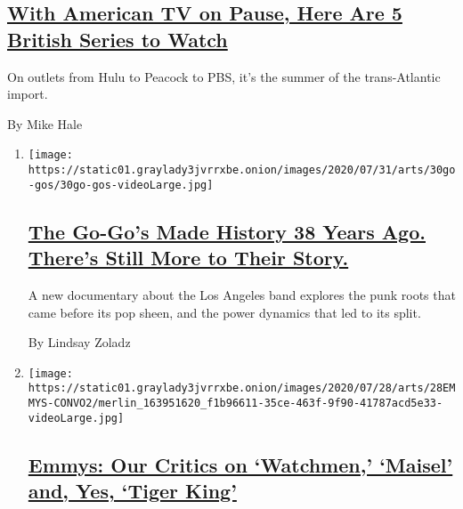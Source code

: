 \begin{enumerate}
  \hypertarget{with-american-tv-on-pause-here-are-5-british-series-to-watch}{%
  \subsection{\texorpdfstring{\href{/2020/07/30/arts/television/in-my-skin-hulu.html}{With
  American TV on Pause, Here Are 5 British Series to
  Watch}}{With American TV on Pause, Here Are 5 British Series to Watch}}\label{with-american-tv-on-pause-here-are-5-british-series-to-watch}}

  On outlets from Hulu to Peacock to PBS, it's the summer of the
  trans-Atlantic import.

  By Mike Hale
\end{enumerate}

\begin{enumerate}
\def\labelenumi{\arabic{enumi}.}
\item
  \texttt{[image: https://static01.graylady3jvrrxbe.onion/images/2020/07/31/arts/30go-gos/30go-gos-videoLarge.jpg]}

  \hypertarget{the-go-gos-made-history-38-years-ago-theres-still-more-to-their-story}{%
  \subsection{\texorpdfstring{\href{/2020/07/29/arts/music/the-go-gos-documentary.html}{The
  Go-Go's Made History 38 Years Ago. There's Still More to Their
  Story.}}{The Go-Go's Made History 38 Years Ago. There's Still More to Their Story.}}\label{the-go-gos-made-history-38-years-ago-theres-still-more-to-their-story}}

  A new documentary about the Los Angeles band explores the punk roots
  that came before its pop sheen, and the power dynamics that led to its
  split.

  By Lindsay Zoladz
\item
  \texttt{[image: https://static01.graylady3jvrrxbe.onion/images/2020/07/28/arts/28EMMYS-CONVO2/merlin\_163951620\_f1b96611-35ce-463f-9f90-41787acd5e33-videoLarge.jpg]}

  \hypertarget{emmys-our-critics-on-watchmen-maisel-and-yes-tiger-king}{%
  \subsection{\texorpdfstring{\href{/2020/07/28/arts/television/emmys-watchmen-handmaids-tale-tiger-king.html}{Emmys:
  Our Critics on `Watchmen,' `Maisel' and, Yes, `Tiger
  King'}}{Emmys: Our Critics on `Watchmen,' `Maisel' and, Yes, `Tiger King'}}\label{emmys-our-critics-on-watchmen-maisel-and-yes-tiger-king}}


\end{enumerate}
